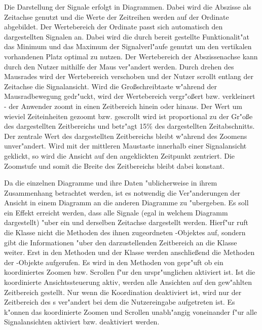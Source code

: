 Die Darstellung der Signale erfolgt in Diagrammen.
Dabei wird die Abszisse als Zeitachse genutzt und die Werte der Zeitreihen werden auf der Ordinate abgebildet.
Der Wertebereich der Ordinate passt sich automatisch den dargestellten Signalen an.
Dabei wird die durch \jfc bereit gestellte Funktionalit"at das Minimum und das Maximum der Signalverl"aufe genutzt um den vertikalen vorhandenen Platz optimal zu nutzen.
Der Wertebereich der Abszissenachse kann durch den Nutzer mithilfe der Maus ver"andert werden.
Durch drehen des Mausrades wird der Wertebereich verschoben und der Nutzer scrollt entlang der Zeitachse die Signalansicht.
Wird die Gro{\ss}schreibtaste w"ahrend der Mausradbewegung gedr"uckt, wird der Wertebereich vergr"o{\ss}ert bzw. verkleinert - der Anwender zoomt in einen Zeitbereich hinein oder hinaus.
Der Wert um wieviel Zeiteinheiten gezoomt bzw. gescrollt wird ist proportional zu der Gr"o{\ss}e des dargestellten Zeitbereichs und betr"agt \unit{15}{\%} des dargestellten Zeitabschnitts.
Der zentrale Wert des dargestellten Zeitbereichs bleibt w"ahrend des Zoomens unver"andert.
Wird mit der mittleren Maustaste innerhalb einer Signalansicht geklickt, so wird die Ansicht auf den angeklickten Zeitpunkt zentriert.
Die Zoomstufe und somit die Breite des Zeitbereichs bleibt dabei konstant.

Da die einzelnen Diagramme und ihre Daten "ublicherweise in ihrem Zusammenhang betrachtet werden, ist es notwendig die Ver"anderungen der Ansicht in einem Diagramm an die anderen Diagramme zu "ubergeben.
Es soll ein Effekt erreicht werden, dass alle Signale (egal in welchem Diagramm dargestellt) "uber ein und derselben Zeitachse dargestellt werden.
Hierf"ur ruft die Klasse  nicht die Methoden des ihnen zugeordneten -Objektes auf, sondern gibt die Informationen "uber den darzustellenden Zeitbereich an die Klasse  weiter.
Erst in den Methoden  und  der Klasse  werden anschlie{\ss}end die Methoden der -Objekte aufgerufen.
Es wird in den Methoden von  gepr"uft ob ein koordiniertes Zoomen bzw. Scrollen f"ur den urspr"unglichen  aktiviert ist.
Ist die koordinierte Ansichtssteuerung aktiv, werden alle Ansichten auf den gew"ahlten Zeitbereich gestellt.
Nur wenn die Koordination deaktiviert ist, wird nur der Zeitbereich des s ver"andert bei dem die Nutzereingabe aufgetreten ist.
Es k"onnen das koordinierte Zoomen und Scrollen unabh"angig voneinander f"ur alle Signalansichten aktiviert bzw. deaktiviert werden.

